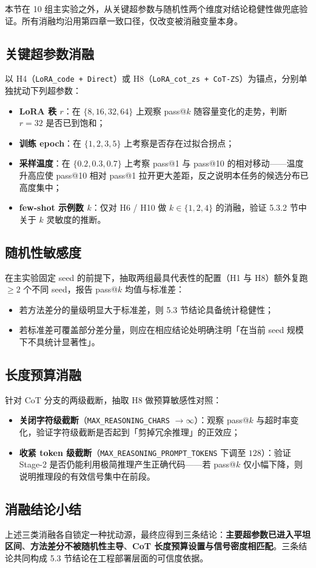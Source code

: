 
本节在 10 组主实验之外，从关键超参数与随机性两个维度对结论稳健性做兜底验证。所有消融均沿用第四章一致口径，仅改变被消融变量本身。

\subsection{关键超参数消融}
以 H4（\texttt{LoRA\_code + Direct}）或 H8（\texttt{LoRA\_cot\_zs + CoT-ZS}）为锚点，分别单独扰动下列超参数：
\begin{itemize}
    \item \textbf{LoRA 秩 $r$}：在 $\{8, 16, 32, 64\}$ 上观察 pass@$k$ 随容量变化的走势，判断 $r{=}32$ 是否已到饱和；
    \item \textbf{训练 epoch}：在 $\{1, 2, 3, 5\}$ 上考察是否存在过拟合拐点；
    \item \textbf{采样温度}：在 $\{0.2, 0.3, 0.7\}$ 上考察 pass@1 与 pass@10 的相对移动——温度升高应使 pass@10 相对 pass@1 拉开更大差距，反之说明本任务的候选分布已高度集中；
    \item \textbf{few-shot 示例数 $k$}：仅对 H6 / H10 做 $k \in \{1, 2, 4\}$ 的消融，验证 5.3.2 节中关于 $k$ 灵敏度的推断。
\end{itemize}

\subsection{随机性敏感度}
在主实验固定 seed 的前提下，抽取两组最具代表性的配置（H1 与 H8）额外复跑 $\ge 2$ 个不同 seed，报告 pass@$k$ 均值与标准差：
\begin{itemize}
    \item 若方法差分的量级明显大于标准差，则 5.3 节结论具备统计稳健性；
    \item 若标准差可覆盖部分差分量，则应在相应结论处明确注明「在当前 seed 规模下不具统计显著性」。
\end{itemize}

\subsection{长度预算消融}
针对 CoT 分支的两级截断，抽取 H8 做预算敏感性对照：
\begin{itemize}
    \item \textbf{关闭字符级截断}（\texttt{MAX\_REASONING\_CHARS} $\to \infty$）：观察 pass@$k$ 与超时率变化，验证字符级截断是否起到「剪掉冗余推理」的正效应；
    \item \textbf{收紧 token 级截断}（\texttt{MAX\_REASONING\_PROMPT\_TOKENS} 下调至 $128$）：验证 Stage-2 是否仍能利用极简推理产生正确代码——若 pass@$k$ 仅小幅下降，则说明推理段的有效信号集中在前段。
\end{itemize}

\subsection{消融结论小结}
上述三类消融各自锁定一种扰动源，最终应得到三条结论：\textbf{主要超参数已进入平坦区间}、\textbf{方法差分不被随机性主导}、\textbf{CoT 长度预算设置与信号密度相匹配}。三条结论共同构成 5.3 节结论在工程部署层面的可信度依据。
